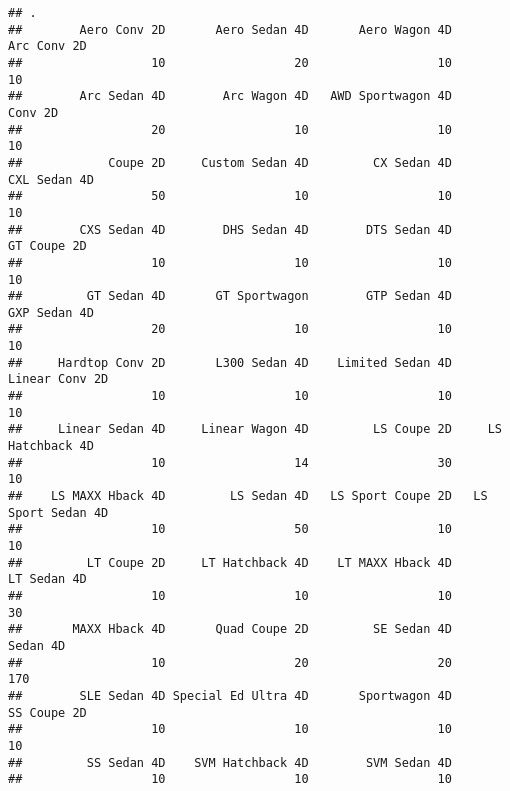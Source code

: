 \documentclass[
]{article}
\begin{document}
\begin{verbatim}
## .
##        Aero Conv 2D       Aero Sedan 4D       Aero Wagon 4D         Arc Conv 2D 
##                  10                  20                  10                  10 
##        Arc Sedan 4D        Arc Wagon 4D   AWD Sportwagon 4D             Conv 2D 
##                  20                  10                  10                  10 
##            Coupe 2D     Custom Sedan 4D         CX Sedan 4D        CXL Sedan 4D 
##                  50                  10                  10                  10 
##        CXS Sedan 4D        DHS Sedan 4D        DTS Sedan 4D         GT Coupe 2D 
##                  10                  10                  10                  10 
##         GT Sedan 4D       GT Sportwagon        GTP Sedan 4D        GXP Sedan 4D 
##                  20                  10                  10                  10 
##     Hardtop Conv 2D       L300 Sedan 4D    Limited Sedan 4D      Linear Conv 2D 
##                  10                  10                  10                  10 
##     Linear Sedan 4D     Linear Wagon 4D         LS Coupe 2D     LS Hatchback 4D 
##                  10                  14                  30                  10 
##    LS MAXX Hback 4D         LS Sedan 4D   LS Sport Coupe 2D   LS Sport Sedan 4D 
##                  10                  50                  10                  10 
##         LT Coupe 2D     LT Hatchback 4D    LT MAXX Hback 4D         LT Sedan 4D 
##                  10                  10                  10                  30 
##       MAXX Hback 4D       Quad Coupe 2D         SE Sedan 4D            Sedan 4D 
##                  10                  20                  20                 170 
##        SLE Sedan 4D Special Ed Ultra 4D       Sportwagon 4D         SS Coupe 2D 
##                  10                  10                  10                  10 
##         SS Sedan 4D    SVM Hatchback 4D        SVM Sedan 4D 
##                  10                  10                  10
\end{verbatim}
\end{document}
